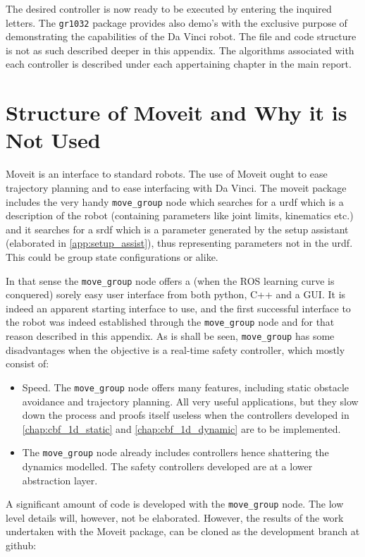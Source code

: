 The desired controller is now ready to be executed by entering the inquired letters. The \texttt{gr1032} package provides also demo's with the exclusive purpose of demonstrating the capabilities of the Da Vinci robot. The file and code structure is not as such described deeper in this appendix. The algorithms associated with each controller is described under each appertaining chapter in the main report. 

\section{Structure of Moveit and Why it is Not Used}\label{sec:moveit}
Moveit is an interface to standard robots. The use of Moveit ought to ease trajectory planning and to ease interfacing with Da Vinci. The moveit package includes the very handy \texttt{move\_group} node which searches for a \gls{urdf} which is a description of the robot (containing parameters like joint limits, kinematics etc.) and it searches for a \gls{srdf} which is 	a parameter generated by the setup assistant (elaborated in \autoref{app:setup_assist}), thus representing parameters not in the \gls{urdf}. This could be group state configurations or alike.

In that sense the \texttt{move\_group} node offers a (when the ROS learning curve is conquered) sorely easy user interface from both python, C++ and a GUI. It is indeed an apparent starting interface to use, and the first successful interface to the robot was indeed established through the \texttt{move\_group} node and for that reason described in this appendix. As is shall be seen, \texttt{move\_group} has some disadvantages when the objective is a real-time safety controller, which mostly consist of:
\begin{itemize}
\item Speed. The \texttt{move\_group} node offers many features, including static obstacle avoidance and trajectory planning. All very useful applications, but they slow down the process and proofs itself useless when the controllers developed in \autoref{chap:cbf_1d_static} and \autoref{chap:cbf_1d_dynamic} are to be implemented.
\item The \texttt{move\_group} node already includes controllers hence shattering the dynamics modelled. The safety controllers developed are at a lower abstraction layer.
\end{itemize}
A significant amount of code is developed with the \texttt{move\_group} node. The low level details will, however, not be elaborated. However, the results of the work undertaken with the Moveit package, can be cloned as the development branch at github:

